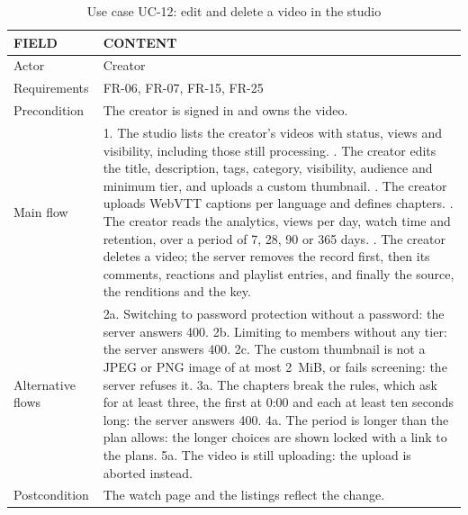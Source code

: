 \begin{table}[H]
\centering
\caption{Use case UC-12: edit and delete a video in the studio}
\label{tab:uc-manage}
\small
\begin{tabularx}{\textwidth}{p{} X}
\toprule
\textbf{FIELD} & \textbf{CONTENT} \\
\midrule
Actor & Creator \\
Requirements & FR-06, FR-07, FR-15, FR-25 \\
Precondition & The creator is signed in and owns the video. \\
Main flow &
  1. The studio lists the creator's videos with status, views and visibility, including those still processing. \newline
  2. The creator edits the title, description, tags, category, visibility, audience and minimum tier, and uploads a custom thumbnail. \newline
  3. The creator uploads WebVTT captions per language and defines chapters. \newline
  4. The creator reads the analytics, views per day, watch time and retention, over a period of 7, 28, 90 or 365 days. \newline
  5. The creator deletes a video; the server removes the record first, then its comments, reactions and playlist entries, and finally the source, the renditions and the key. \\
Alternative flows &
  2a. Switching to password protection without a password: the server answers 400. \newline
  2b. Limiting to members without any tier: the server answers 400. \newline
  2c. The custom thumbnail is not a JPEG or PNG image of at most 2~MiB, or fails screening: the server refuses it. \newline
  3a. The chapters break the rules, which ask for at least three, the first at 0:00 and each at least ten seconds long: the server answers 400. \newline
  4a. The period is longer than the plan allows: the longer choices are shown locked with a link to the plans. \newline
  5a. The video is still uploading: the upload is aborted instead. \\
Postcondition & The watch page and the listings reflect the change. \\
\bottomrule
\end{tabularx}
\end{table}

